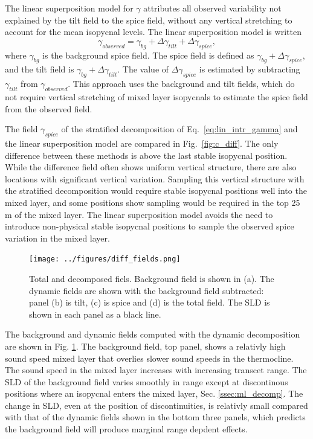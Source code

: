\documentclass[preprint,NumberedRefs]{JASA}
\begin{document}
The linear superposition model for $\gamma$ attributes all observed variability not explained by the tilt field to the spice field, without any vertical stretching to account for the mean isopycnal levels. The linear superposition model is written
\begin{equation}
    \gamma_{observed} = \gamma_{bg} + \Delta \gamma_{tilt} + \Delta \gamma_{spice},
    \label{eq:lin_sup}
\end{equation}
where $\gamma_{bg}$ is the background spice field. The spice field is defined as $\gamma_{bg} + \Delta \gamma_{spice}$, and the tilt field is $\gamma_{bg} + \Delta \gamma_{tilt}$. The value of $\Delta \gamma_{spice}$ is estimated by subtracting $\gamma_{tilt}$ from $\gamma_{observed}$. This approach uses the background and tilt fields, which do not require vertical stretching of mixed layer isopycnals to estimate the spice field from the observed field.

The field $\gamma_{spice}$ of the stratified decomposition of Eq.~\eqref{eq:lin_intr_gamma} and the linear superposition model are compared in Fig.~\ref{fig:c_diff}. The only difference between these methods is above the last stable isopycnal position. While the difference field often shows uniform vertical structure, there are also locations with significant vertical variation. Sampling this vertical structure with the stratified decomposition would require stable isopycnal positions well into the mixed layer, and some positions show sampling would be required in the top 25 m of the mixed layer. The linear superposition model avoids the need to introduce non-physical stable isopycnal positions to sample the observed spice variation in the mixed layer.

\begin{figure}
\texttt{[image: ../figures/diff\_fields.png]}
        \caption{\label{fig:c_fields}{Total and decomposed fiels. Background field is shown in (a). The dynamic fields are shown with the background field subtracted: panel (b) is tilt, (c) is spice and (d) is the total field. The SLD is shown in each panel as a black line.}}
\end{figure}

The background and dynamic fields computed with the dynamic decomposition are shown in Fig. \ref{fig:c_fields}. The background field, top panel, shows a relativly high sound speed mixed layer that overlies slower sound speeds in the thermocline. The sound speed in the mixed layer increases with increasing transcet range. The SLD of the background field varies smoothly in range except at discontinous positions where an isopycnal enters the mixed layer, Sec. \ref{ssec:ml_decomp}. The change in SLD, even at the position of discontinuities, is relativly small compared with that of the dynamic fields shown in the bottom three panels, which predicts the background field will produce marginal range depdent effects.
\end{document}
